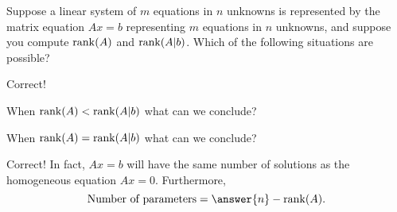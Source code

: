 \documentclass{ximera}
\begin{document}
\begin{question}
Suppose a linear system of $m$ equations in $n$ unknowns is represented by the matrix equation $Ax=b$ representing $m$ equations in $n$ unknowns, 
and suppose you compute ${\rm rank}(A)$ and ${\rm rank}(A|b)$.  Which of the following situations are possible? 
\begin{selectAll}
\end{selectAll}

\begin{question}
Correct!  

When ${\rm rank}(A) < {\rm rank}(A|b)$ what can we conclude? 
\begin{multipleChoice}
\end{multipleChoice}

When ${\rm rank}(A) = {\rm rank}(A|b)$ what can we conclude? 
\begin{multipleChoice}
\end{multipleChoice}

\begin{question}
Correct!  In fact, $Ax=b$ will have the same number of solutions as the homogeneous equation $Ax=0$.  
Furthermore, 
\[
\text{Number of parameters} = \answer{n} - {\rm rank}(A). 
\]
\end{question}
\end{question}
\end{question}
\end{document}
